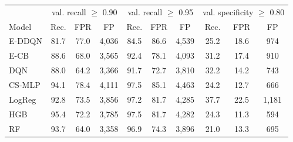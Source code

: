 \begin{tabular}{lccccccccc}
\toprule
 & \multicolumn{3}{c}{val. recall $\ge$ 0.90} & \multicolumn{3}{c}{val. recall $\ge$ 0.95} & \multicolumn{3}{c}{val. specificity $\ge$ 0.80} \\
Model & Rec. & FPR & FP & Rec. & FPR & FP & Rec. & FPR & FP \\
\midrule
E-DDQN & 81.7 & 77.0 & 4,036 & 84.5 & 86.6 & 4,539 & 25.2 & 18.6 & 974 \\
E-CB & 88.6 & 68.0 & 3,565 & 92.4 & 78.1 & 4,093 & 31.2 & 17.4 & 910 \\
DQN & 88.0 & 64.2 & 3,366 & 91.7 & 72.7 & 3,810 & 32.2 & 14.2 & 743 \\
CS-MLP & 94.1 & 78.4 & 4,111 & 97.5 & 85.1 & 4,463 & 24.2 & 12.7 & 666 \\
LogReg & 92.8 & 73.5 & 3,856 & 97.2 & 81.7 & 4,285 & 37.7 & 22.5 & 1,181 \\
HGB & 95.4 & 72.2 & 3,785 & 97.5 & 81.7 & 4,282 & 24.3 & 11.3 & 594 \\
RF & 93.7 & 64.0 & 3,358 & 96.9 & 74.3 & 3,896 & 21.0 & 13.3 & 695 \\
\bottomrule
\end{tabular}
